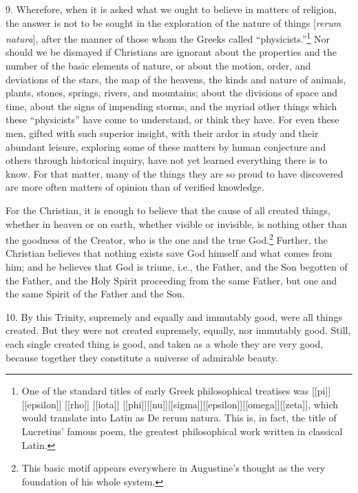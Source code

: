 
9. Wherefore, when it is asked what we ought to believe in matters of religion, the answer is not to be sought in the exploration of the nature of things [\emph{rerum natura}], after the manner of those whom the Greeks called ``physicists.''\footnote{One of the standard titles of early Greek philosophical treatises was [[pi]] [[epsilon]] [[rho]] [[iota]] [[phi]][[nu]][[sigma]][[epsilon]][[omega]][[zeta]], which would translate into Latin as De rerum natura. This is, in fact, the title of Lucretius' famous poem, the greatest philosophical work written in classical Latin.} Nor should we be dismayed if Christians are ignorant about the properties and the number of the basic elements of nature, or about the motion, order, and deviations of the stars, the map of the heavens, the kinds and nature of animals, plants, stones, springs, rivers, and mountains; about the divisions of space and time, about the signs of impending storms, and the myriad other things which these ``physicists'' have come to understand, or think they have. For even these men, gifted with such superior insight, with their ardor in study and their abundant leisure, exploring some of these matters by human conjecture and others through historical inquiry, have not yet learned everything there is to know. For that matter, many of the things they are so proud to have discovered are more often matters of opinion than of verified knowledge.

For the Christian, it is enough to believe that the cause of all created things, whether in heaven or on earth, whether visible or invisible, is nothing other than the goodness of the Creator, who is the one and the true God.\footnote{This basic motif appears everywhere in Augustine's thought as the very foundation of his whole system.} Further, the Christian believes that nothing exists save God himself and what comes from him; and he believes that God is triune, i.e., the Father, and the Son begotten of the Father, and the Holy Spirit proceeding from the same Father, but one and the same Spirit of the Father and the Son.

10. By this Trinity, supremely and equally and immutably good, were all things created. But they were not created supremely, equally, nor immutably good. Still, each single created thing is good, and taken as a whole they are very good, because together they constitute a universe of admirable beauty.

